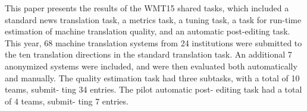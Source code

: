 This paper presents the results of the WMT15 shared tasks, which included a standard news translation task, a metrics task, a tuning task, a task for run-time estimation of machine translation quality, and an automatic post-editing task. This year, 68 machine translation systems from 24 institutions were submitted to the ten translation directions in the standard translation task. An additional 7 anonymized systems were included, and were then evaluated both automatically and manually. The quality estimation task had three subtasks, with a total of 10 teams, submit- ting 34 entries. The pilot automatic post- editing task had a total of 4 teams, submit- ting 7 entries.
